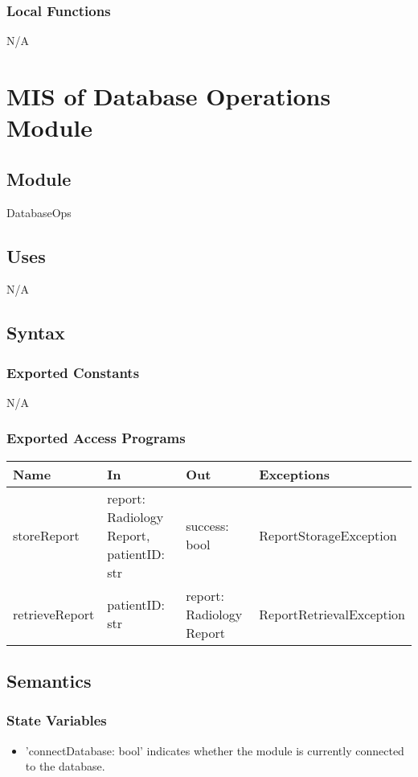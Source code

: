 \documentclass[12pt, titlepage]{article}
\begin{document}
\subsubsection{Local Functions}
N/A

\newpage

\section{MIS of Database Operations Module} \label{Module} 

\subsection{Module}
DatabaseOps

\subsection{Uses}
N/A

\subsection{Syntax}

\subsubsection{Exported Constants}
N/A
\subsubsection{Exported Access Programs}

\begin{center}
\begin{tabular}{p{3cm} p{5cm} p{4cm} p{5cm}}
\hline
\textbf{Name} & \textbf{In} & \textbf{Out} & \textbf{Exceptions} \\
\hline
storeReport & report: Radiology Report, patientID: str & success: bool & ReportStorageException \\
retrieveReport & patientID: str & report: Radiology Report & ReportRetrievalException \\
\hline
\end{tabular}
\end{center}

\subsection{Semantics}

\subsubsection{State Variables}
\begin{itemize}
    \item 'connectDatabase: bool' indicates whether the module is currently connected to the database.
\end{itemize}
\end{document}
